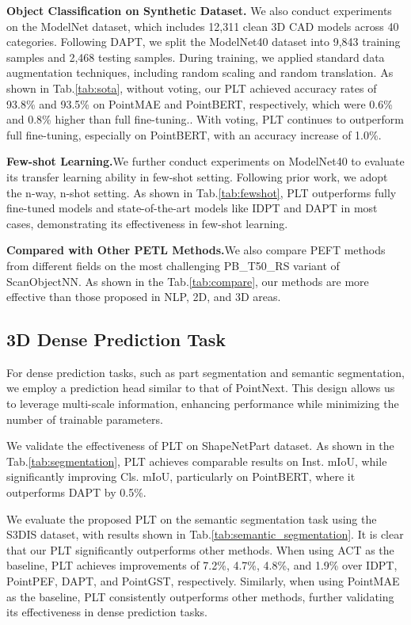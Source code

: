 \textbf{Object Classification on Synthetic Dataset.} We also conduct experiments on the ModelNet dataset\cite{wu20153d}, which includes 12,311 clean 3D CAD models across 40 categories. Following DAPT\cite{zhou2024dynamic}, we split the ModelNet40 dataset into 9,843 training samples and 2,468 testing samples. During training, we applied standard data augmentation techniques, including random scaling and random translation. As shown in Tab.\ref{tab:sota}, without voting, our PLT achieved accuracy rates of 93.8\% and 93.5\% on PointMAE and PointBERT, respectively, which were 0.6\% and 0.8\% higher than full fine-tuning.. With voting, PLT continues to outperform full fine-tuning, especially on PointBERT, with an accuracy increase of 1.0\%.

\textbf{Few-shot Learning.}We further conduct experiments on ModelNet40 to evaluate its transfer learning ability in few-shot setting. Following prior work\cite{pang2022masked,zha2023instance,zhou2024dynamic}, we adopt the n-way, n-shot setting. As shown in Tab.\ref{tab:fewshot}, PLT outperforms fully fine-tuned models and state-of-the-art models like IDPT\cite{zha2023instance} and DAPT\cite{zhou2024dynamic} in most cases, demonstrating its effectiveness in few-shot learning.

\textbf{Compared with Other PETL Methods.}We also compare PEFT methods from different fields on the most challenging PB\_T50\_RS variant of ScanObjectNN\cite{uy2019revisiting}. As shown in the Tab.\ref{tab:compare}, our methods are more effective than those proposed in NLP, 2D, and 3D areas.





\subsection{3D Dense Prediction Task}
For dense prediction tasks, such as part segmentation and semantic segmentation, we employ a prediction head similar to that of PointNext. This design allows us to leverage multi-scale information, enhancing performance while minimizing the number of trainable parameters.

We validate the effectiveness of PLT on ShapeNetPart dataset\cite{chang2015shapenet}. As shown in the Tab.\ref{tab:segmentation}, PLT achieves comparable results on Inst. mIoU, while significantly improving Cls. mIoU, particularly on PointBERT, where it outperforms DAPT by 0.5\%.

We evaluate the proposed PLT on the semantic segmentation task using the S3DIS dataset\cite{armeni20163d}, with results shown in Tab.\ref{tab:semantic_segmentation}. It is clear that our PLT significantly outperforms other methods. When using ACT as the baseline, PLT achieves improvements of 7.2\%, 4.7\%, 4.8\%, and 1.9\% over IDPT, PointPEF, DAPT, and PointGST, respectively. Similarly, when using PointMAE as the baseline, PLT consistently outperforms other methods, further validating its effectiveness in dense prediction tasks.

